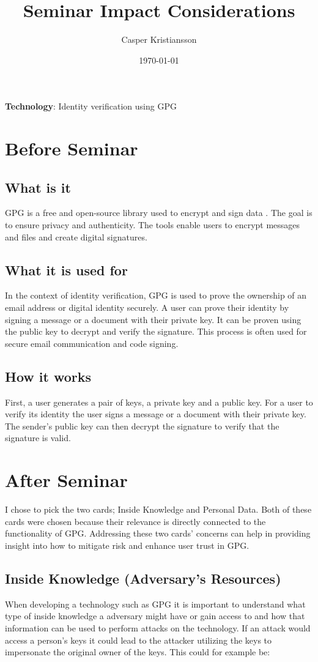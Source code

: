 \documentclass{article}
\title{Seminar Impact Considerations}
\author{Casper Kristiansson}
\date{\today}
\begin{document}
\maketitle

\noindent \textbf{Technology}: Identity verification using GPG

\section{Before Seminar}
\subsection{What is it}
GPG is a free and open-source library used to encrypt and sign data \cite{gpg}. The goal is to ensure privacy and authenticity. The tools enable users to encrypt messages and files and create digital signatures.

\subsection{What it is used for}
In the context of identity verification, GPG is used to prove the ownership of an email address or digital identity securely. A user can prove their identity by signing a message or a document with their private key. It can be proven using the public key to decrypt and verify the signature. This process is often used for secure email communication and code signing.

\subsection{How it works}
First, a user generates a pair of keys, a private key and a public key. For a user to verify its identity the user signs a message or a document with their private key. The sender's public key can then decrypt the signature to verify that the signature is valid.


\section{After Seminar}
I chose to pick the two cards; Inside Knowledge and Personal Data. Both of these cards were chosen because their relevance is directly connected to the functionality of GPG. Addressing these two cards' concerns can help in providing insight into how to mitigate risk and enhance user trust in GPG.

\subsection{Inside Knowledge (Adversary's Resources)}
When developing a technology such as GPG it is important to understand what type of inside knowledge a adversary might have or gain access to and how that information can be used to perform attacks on the technology. If an attack would access a person's keys it could lead to the attacker utilizing the keys to impersonate the original owner of the keys. This could for example be:
\end{document}
